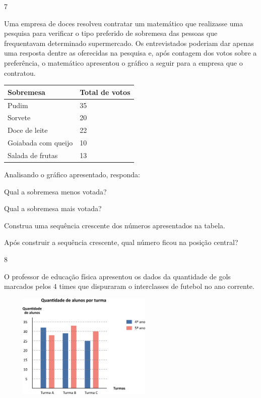 \begin{escolha}
{\begin{escolha}
{\num{7}

Uma empresa de doces resolveu contratar um matemático que realizasse uma
pesquisa para verificar o tipo preferido de sobremesa das pessoas que
frequentavam determinado supermercado. Os entrevistados poderiam dar
apenas uma resposta dentre as oferecidas na pesquisa e, após contagem dos
votos sobre a preferência, o matemático apresentou o gráfico a seguir
para a empresa que o contratou.

\begin{longtable}[]{@{}ll@{}}
\toprule
Sobremesa & Total de votos\tabularnewline
\midrule
\endhead
Pudim & 35\tabularnewline
Sorvete & 20\tabularnewline
Doce de leite & 22\tabularnewline
Goiabada com queijo & 10\tabularnewline
Salada de frutas & 13\tabularnewline
\bottomrule
\end{longtable}

Analisando o gráfico apresentado, responda:

\begin{escolha}

\item
  Qual a sobremesa menos votada?

\item
  Qual a sobremesa mais votada?

\item
  Construa uma sequência crescente dos números apresentados na tabela.

\item
  Após construir a sequência crescente, qual número ficou na posição
  central?
\end{escolha}

\num{8}

O professor de educação física apresentou os dados da quantidade de gols
marcados pelos 4 times que dispuraram o interclasses de futebol no ano
corrente.


\includegraphics[width=3.30769in,height=1.97201in]{media/image97.png}

}
\end{escolha}}
\end{escolha}
